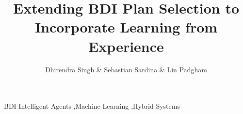 \documentclass[preprint,12pt]{elsarticle}
\begin{document}
\begin{frontmatter}



\title{Extending BDI Plan Selection to Incorporate Learning from Experience}


\author{Dhirendra Singh \& Sebastian Sardina \& Lin Padgham}
\address{RMIT University, Melbourne, Australia}

\begin{abstract}

\end{abstract}

\begin{keyword}

BDI Intelligent Agents \sep Machine Learning \sep Hybrid Systems




\end{keyword}

\end{frontmatter}





\end{document}
